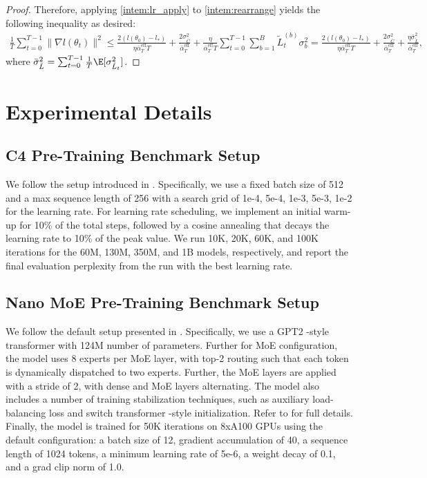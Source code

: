 \documentclass[11pt, a4paper, twocolumn, copyright, goog]{google}
\theoremstyle{plain}
\theoremstyle{definition}
\theoremstyle{remark}
\begin{document}
\begin{proof}
    Therefore, applying \eqref{intem:lr_apply} to \eqref{intem:rearrange} yields the following inequality as desired:
    \begin{multline}
        \frac{1}{T} \sum_{t=0}^{T-1}  \|\nabla l(\theta_t) \|^2 
            \le \frac{2(l(\theta_0) - l_*) }{\eta \bar{\alpha}_{T}^{\textrm{eff}} T}
            +   \frac{2 \sigma^2_{\bar{C}}}{\bar{\alpha}_{T}^{\textrm{eff}}}  
            + \frac{\eta}{\bar{\alpha}_{T}^{\textrm{eff}} T} \sum_{t=0}^{T-1} \sum_{b=1}^{B} \tilde{L}_{t}^{(b)} \sigma_b^2 
                = \frac{2(l(\theta_0) - l_*) }{\eta \bar{\alpha}_{T}^{\textrm{eff}} T}
                +   \frac{2 \sigma^2_{\bar{C}}}{\bar{\alpha}_{T}^{\textrm{eff}}}  
                + \frac{\eta \bar{\sigma}^2_{\tilde{L}}}{ \bar{\alpha}_{T}^{\textrm{eff}}} ,
    \end{multline}
    where $ \bar{\sigma}^2_{\tilde{L}} = \sum_{t=0}^{T-1} \frac{1}{T} \E [\sigma^2_{\tilde{L}_t}]$.
\end{proof}



\section{Experimental Details} 

\subsection{C4 Pre-Training Benchmark Setup} \label{appx:exp_details}
We follow the setup introduced in \citet{zhao2024galore}. Specifically, we use a fixed batch size of 512 and a max sequence length of 256 with a search grid of 1e-4, 5e-4, 1e-3, 5e-3, 1e-2 for the learning rate. For learning rate scheduling, we implement an initial warm-up for 10\% of the total steps, followed by a cosine annealing that decays the learning rate to 10\% of the peak value. We run 10K, 20K, 60K, and 100K iterations for the 60M, 130M, 350M, and 1B models, respectively, and report the final evaluation perplexity from the run with the best learning rate.

\subsection{Nano MoE Pre-Training Benchmark Setup} \label{appx:nano_moe-exp_details}
We follow the default setup presented in \citet{wolfe2024nanomoe}. 
Specifically, we use a GPT2 \citep{radford2019language}-style transformer with 124M number of parameters. 
Further for MoE configuration, the model uses 8 experts per MoE layer, with top-2 routing such that each token is dynamically dispatched to two experts. 
Further, the MoE layers are applied with a stride of 2, with dense and MoE layers alternating. The model also includes a number of training stabilization techniques, such as auxiliary load-balancing loss and switch transformer \citep{fedus2022switch}-style initialization. Refer to \citet{wolfe2024nanomoe} for full details. 
Finally, the model is trained for 50K iterations on 8xA100 GPUs using the default configuration: a batch size of 12, gradient accumulation of 40, a sequence length of 1024 tokens, a minimum learning rate of 5e-6, a weight decay of 0.1, and a grad clip norm of 1.0.
\end{document}
